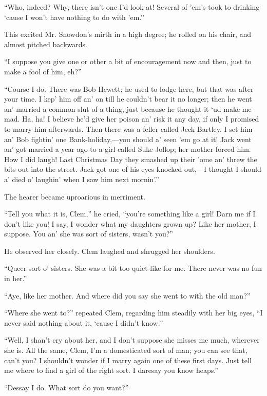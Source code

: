 ``Who, indeed? Why, there isn't one I'd look at! Several of 'em's took
to drinking `cause I won't have nothing to do with 'em.''

This excited Mr. Snowdon's mirth in a high degree; he rolled on his
chair, and almost pitched backwards.

``I suppose you give one or other a bit of encouragement now and then,
just to make a fool of him, eh?''

``Course I do. There was Bob Hewett; he used to lodge here, but that was
after your time. I kep' him off an' on till he couldn't bear it no
longer; then he went an' married a common slut of a thing, just because
he thought it `ud make me mad. Ha, ha! I believe he'd give her poison
an' risk it any day, if only I promised to marry him afterwards. Then
there was a feller called Jeck Bartley. I set him an' Bob fightin' one
Bank-holiday,---you should a' seen 'em go at it! Jack went an' got
married a year ago to a girl called Suke Jollop; her mother forced
{}him. How I did laugh! Last Christmas Day they smashed up their 'ome
an' threw the bits out into the street. Jack got one of his eyes knocked
out,---I thought I should a' died o' laughin' when I saw him next
mornin'.''

The hearer became uproarious in merriment.

``Tell you what it is, Clem,'' he cried, ``you're something like a girl!
Darn me if I don't like you! I say, I wonder what my daughters grown up?
Like her mother, I suppose. You an' she was sort of sisters, wasn't
you?''

He observed her closely. Clem laughed and shrugged her shoulders.

``Queer sort o' sisters. She was a bit too quiet-like for me. There
never was no fun in her.''

``Aye, like her mother. And where did you say she went to with the old
man?''

``Where she went to?'' repeated Clem, regarding him steadily with her
big eyes, ``I never said nothing about it, `cause I didn't know.''

``Well, I shan't cry about her, and I don't {}suppose she misses me
much, wherever she is. All the same, Clem, I'm a domesticated sort of
man; you can see that, can't you? I shouldn't wonder if I marry again
one of these first days. Just tell me where to find a girl of the right
sort. I daresay you know heaps.''

``Dessay I do. What sort do you want?''

